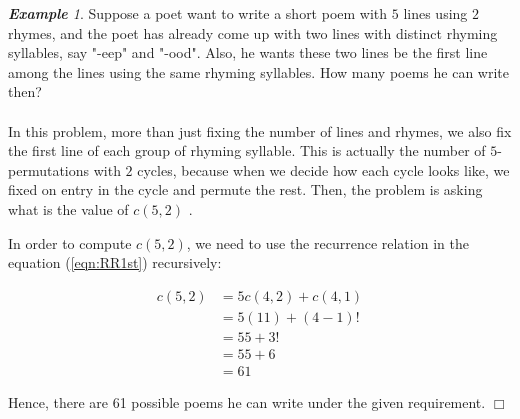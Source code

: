 \documentclass{article}
\theoremstyle{definition}
\theoremstyle{remark}
\theoremstyle{example}
\newtheorem{example}{\textbf{Example}}[section]
\newcommand{\qedwhite}{\hfill \ensuremath{\Box}}
\begin{document}
\begin{example}
    Suppose a poet want to write a short poem with $5$ lines using $2$ rhymes, and the poet has already come up with two lines with distinct rhyming syllables, say "-eep" and "-ood". Also, he wants these two lines be the first line among the lines using the same rhyming syllables. How many poems he can write then?
\end{example}

\paragraph{  }

In this problem, more than just fixing the number of lines and rhymes, we also fix the first line of each group of rhyming syllable. This is actually the number of $5$-permutations with $2$ cycles, because when we decide how each cycle looks like, we fixed on entry in the cycle and permute the rest. Then, the problem is asking what is the value of $c(5,2)$ \cite{rogers_rhyming_1981}.

In order to compute $c(5,2)$, we need to use the recurrence relation in the equation (\ref{eqn:RR1st}) recursively:

\begin{align}
    c(5,2) & = 5c(4,2) + c(4,1)\\
    & = 5(11) + (4-1)!\\
    & = 55 + 3!\\
    & = 55 + 6\\
    & = 61
\end{align}

Hence, there are 61 possible poems he can write under the given requirement. \qedwhite

\newpage


\nocite{*}
\end{document}
